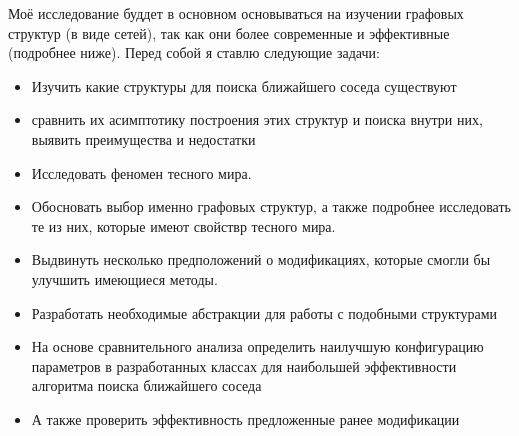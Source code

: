 \begin{justify}
    Моё исследование буддет в основном основываться на изучении
    графовых структур (в виде сетей), так как они более современные
    и эффективные (подробнее ниже). Перед собой я ставлю следующие 
    задачи:
    \begin{itemize}
        \item Изучить какие структуры для поиска ближайшего соседа существуют
        \item сравнить их асимптотику построения этих структур и поиска 
        внутри них, выявить преимущества и недостатки 
        \item Исследовать феномен тесного мира.
        \item Обосновать выбор именно графовых структур, а также подробнее 
        исследовать те из них, которые имеют свойствр тесного мира.
        \item Выдвинуть несколько предположений о модификациях, которые
        смогли бы улучшить имеющиеся методы.
        \item Разработать необходимые абстракции для работы с подобными
        структурами
        \item На основе сравнительного анализа определить наилучшую
        конфигурацию парамет\-ров в разработанных классах для наибольшей
        эффективности алгоритма поиска ближайшего соседа
        \item А также проверить эффективность предложенные ранее модификации
    \end{itemize}    
    

\end{justify}


